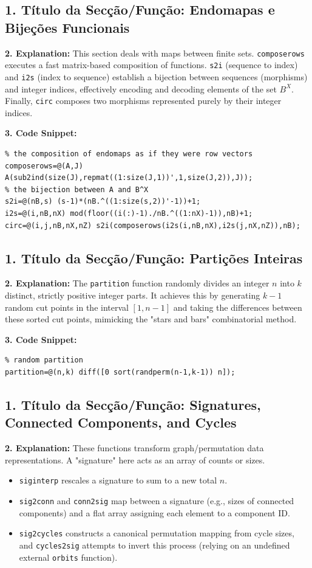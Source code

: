 \subsection{1. Título da Secção/Função: Endomapas e Bijeções Funcionais}
\textbf{2. Explanation:} This section deals with maps between finite sets. \texttt{composerows} executes a fast matrix-based composition of functions. \texttt{s2i} (sequence to index) and \texttt{i2s} (index to sequence) establish a bijection between sequences (morphisms) and integer indices, effectively encoding and decoding elements of the set $B^X$. Finally, \texttt{circ} composes two morphisms represented purely by their integer indices.

\textbf{3. Code Snippet:}
\begin{lstlisting}
% the composition of endomaps as if they were row vectors
composerows=@(A,J) A(sub2ind(size(J),repmat((1:size(J,1))',1,size(J,2)),J));
% the bijection between A and B^X
s2i=@(nB,s) (s-1)*(nB.^((1:size(s,2))'-1))+1; 
i2s=@(i,nB,nX) mod(floor((i(:)-1)./nB.^((1:nX)-1)),nB)+1; 
circ=@(i,j,nB,nX,nZ) s2i(composerows(i2s(i,nB,nX),i2s(j,nX,nZ)),nB); 
\end{lstlisting}

\subsection{1. Título da Secção/Função: Partições Inteiras}
\textbf{2. Explanation:} The \texttt{partition} function randomly divides an integer $n$ into $k$ distinct, strictly positive integer parts. It achieves this by generating $k-1$ random cut points in the interval $[1, n-1]$ and taking the differences between these sorted cut points, mimicking the "stars and bars" combinatorial method.

\textbf{3. Code Snippet:}
\begin{lstlisting}
% random partition 
partition=@(n,k) diff([0 sort(randperm(n-1,k-1)) n]); 
\end{lstlisting}

\subsection{1. Título da Secção/Função: Signatures, Connected Components, and Cycles}
\textbf{2. Explanation:} These functions transform graph/permutation data representations. A "signature" here acts as an array of counts or sizes. 
\begin{itemize}
    \item \texttt{siginterp} rescales a signature to sum to a new total $n$.
    \item \texttt{sig2conn} and \texttt{conn2sig} map between a signature (e.g., sizes of connected components) and a flat array assigning each element to a component ID.     \item \texttt{sig2cycles} constructs a canonical permutation mapping from cycle sizes, and \texttt{cycles2sig} attempts to invert this process (relying on an undefined external \texttt{orbits} function).
\end{itemize}

